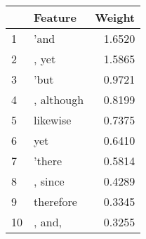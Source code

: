 \begin{tabular}{llr}
\toprule
{} &     Feature &  Weight \\
\midrule
1  &        'and &  1.6520 \\
2  &       , yet &  1.5865 \\
3  &        'but &  0.9721 \\
4  &  , although &  0.8199 \\
5  &    likewise &  0.7375 \\
6  &         yet &  0.6410 \\
7  &      'there &  0.5814 \\
8  &     , since &  0.4289 \\
9  &   therefore &  0.3345 \\
10 &      , and, &  0.3255 \\
\bottomrule
\end{tabular}

